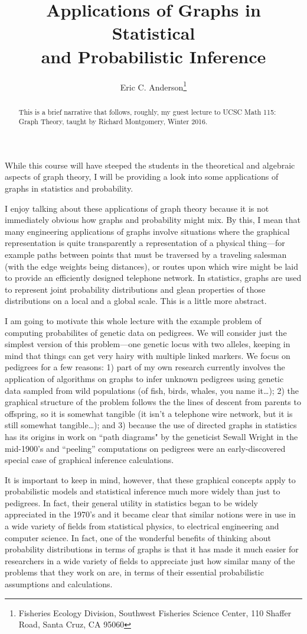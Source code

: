 \documentclass[11pt]{article}
\title{Applications of Graphs in Statistical \\
and Probabilistic Inference}
\author{Eric C. Anderson\thanks{
    Fisheries Ecology Division, 
    Southwest Fisheries Science Center, 
    110 Shaffer Road,
    Santa Cruz, CA 95060}
}
\begin{document}
\maketitle

\begin{abstract}
This is a brief narrative that follows, roughly, my guest lecture to
UCSC Math 115: Graph Theory, taught by Richard Montgomery, Winter 2016.
\end{abstract}

While this course will have steeped the students in the theoretical and algebraic
aspects of graph theory, I will be providing a look into some applications of
graphs in statistics and probability.

I enjoy talking about these
applications of graph theory because it is not immediately 
obvious how graphs and probability might mix.  
By this, I mean that many engineering applications of graphs involve situations where the graphical
representation is quite transparently a representation of a physical thing---for example
paths between points that must be traversed by a traveling salesman (with the edge weights
being distances), or routes upon which wire might be laid to provide an efficiently designed
telephone network.  In statistics, graphs are used to represent joint probability distributions
and glean properties of those distributions on a local and a global scale.  This is a little more
abstract. 

I am going to motivate this whole lecture with the example problem of computing probabilites of
genetic data on pedigrees.  We will consider just the simplest version of this problem---one genetic
locus with two alleles, keeping in mind that things can get very hairy with multiple linked markers. 
We focus on pedigrees for a few reasons: 1) part of my own research currently involves the application of 
algorithms on graphs to infer unknown pedigrees using genetic data sampled from wild populations 
(of fish, birds, whales, you name it\ldots); 2) the graphical structure of the problem follows the 
the lines of descent from parents to offspring, so it is somewhat tangible (it isn't
a telephone wire network, but it is still somewhat tangible\ldots); and 3) because the use
of directed graphs in statistics
has its origins in work on ``path diagrams" by the geneticist Sewall Wright in the mid-1900's and 
``peeling'' computations on pedigrees were an early-discovered special case of graphical inference
calculations.

It is important to keep in mind, however, that these graphical concepts apply to probabilistic models
and statistical inference much more widely than just to pedigrees.  In fact, their general utility 
in statistics began to be widely appreciated in the 1970's and it became clear that similar 
notions were in use in a wide variety of fields from statistical physics, to electrical engineering
and computer science.  In fact, one of the wonderful benefits of thinking about probability distributions
in terms of graphs is that it has made it much easier for researchers in a wide variety of fields to
appreciate just how similar many of the problems that they work on are, in terms of their 
essential probabilistic assumptions and calculations.  
\end{document}

